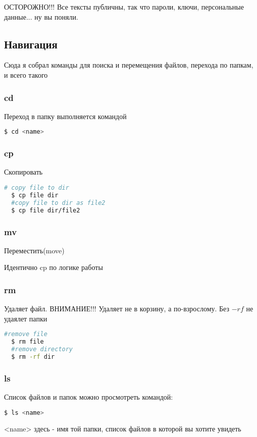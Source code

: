 \documentclass[11pt]{article}
\begin{document}
ОСТОРОЖНО!!! Все тексты публичны, так что пароли, ключи, персональные данные... ну вы поняли.


\subsection{Навигация}
Сюда я собрал команды для поиска и перемещения файлов, перехода по папкам, и всего такого
\subsubsection{cd}
Переход в папку выполняется командой 
\begin{lstlisting}[language=bash]
  $ cd <name>
\end{lstlisting}

\subsubsection{cp}
Скопировать 
\begin{lstlisting}[language=bash]
  # copy file to dir
  $ cp file dir
  #copy file to dir as file2
  $ cp file dir/file2
\end{lstlisting}

\subsubsection{mv}
Переместить(move)

Идентично cp по логике работы

\subsubsection{rm}
Удаляет файл. ВНИМАНИЕ!!! Удаляет не в корзину, а по-взрослому. Без $-rf$ не удаялет папки
\begin{lstlisting}[language=bash]
  #remove file
  $ rm file
  #remove directory
  $ rm -rf dir
\end{lstlisting}

\subsubsection{ls}
Список файлов и папок можно просмотреть командой:
\begin{lstlisting}[language=bash]
  $ ls <name>
\end{lstlisting}
<name> здесь - имя той папки, список файлов в которой вы хотите увидеть
\end{document}
